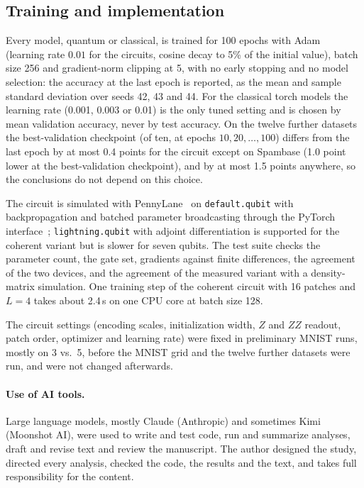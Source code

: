 \documentclass[11pt]{article}
\begin{document}
\subsection{Training and implementation}
\label{sec:meth-training}

Every model, quantum or classical, is trained for 100 epochs with Adam~\cite{kingma2014adam} (learning rate $0.01$ for the circuits, cosine decay to 5\% of the initial value), batch size 256 and gradient-norm clipping at 5, with no early stopping and no model selection: the accuracy at the last epoch is reported, as the mean and sample standard deviation over seeds 42, 43 and 44. For the classical torch models the learning rate (0.001, 0.003 or 0.01) is the only tuned setting and is chosen by mean validation accuracy, never by test accuracy. On the twelve further datasets the best-validation checkpoint (of ten, at epochs $10,20,\dots,100$) differs from the last epoch by at most 0.4 points for the circuit except on Spambase (1.0 point lower at the best-validation checkpoint), and by at most 1.5 points anywhere, so the conclusions do not depend on this choice.

The circuit is simulated with PennyLane~\cite{bergholm2018pennylane} on \texttt{default.qubit} with backpropagation and batched parameter broadcasting through the PyTorch interface~\cite{paszke2019pytorch}; \texttt{lightning.qubit} with adjoint differentiation is supported for the coherent variant but is slower for seven qubits. The test suite checks the parameter count, the gate set, gradients against finite differences, the agreement of the two devices, and the agreement of the measured variant with a density-matrix simulation. One training step of the coherent circuit with 16 patches and $L=4$ takes about 2.4\,s on one CPU core at batch size 128.

The circuit settings (encoding scales, initialization width, $Z$ and $ZZ$ readout, patch order, optimizer and learning rate) were fixed in preliminary MNIST runs, mostly on 3 vs.\ 5, before the MNIST grid and the twelve further datasets were run, and were not changed afterwards.

\paragraph{Use of AI tools.}
Large language models, mostly Claude (Anthropic) and sometimes Kimi (Moonshot AI), were used to write and test code, run and summarize analyses, draft and revise text and review the manuscript. The author designed the study, directed every analysis, checked the code, the results and the text, and takes full responsibility for the content.
\end{document}
